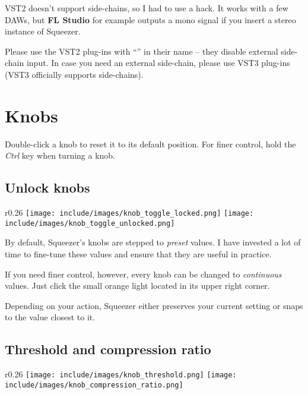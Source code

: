 VST2 doesn't support side-chains, so I had to use a hack.  It works
with a few DAWs, but \textbf{FL Studio} for example outputs a mono
signal if you insert a stereo instance of Squeezer.

Please use the VST2 plug-ins with ``'' in their
name -- they disable external side-chain input.  In case you need an
external side-chain, please use VST3 plug-ins (VST3 officially
supports side-chains).

\chapter{Knobs}
\label{sec:knobs}

Double-click a knob to reset it to its default position.  For finer
control, hold the \emph{Ctrl} key when turning a knob.

\section{Unlock knobs}
\label{sec:unlock_knobs}

\begin{wrapfigure}{r}{0.26\linewidth}
  \texttt{[image: include/images/knob\_toggle\_locked.png]}
  \texttt{[image: include/images/knob\_toggle\_unlocked.png]}
\end{wrapfigure}

By default, Squeezer's knobs are stepped to \emph{preset} values.  I
have invested a lot of time to fine-tune these values and ensure that
they are useful in practice.

If you need finer control, however, every knob can be changed to
\emph{continuous} values.  Just click the small orange light located
in its upper right corner.

Depending on your action, Squeezer either preserves your current
setting or snaps to the value closest to it.

\newpage %

\section{Threshold and compression ratio}

\begin{wrapfigure}{r}{0.26\linewidth}
  \texttt{[image: include/images/knob\_threshold.png]}
  \texttt{[image: include/images/knob\_compression\_ratio.png]}
\end{wrapfigure}

